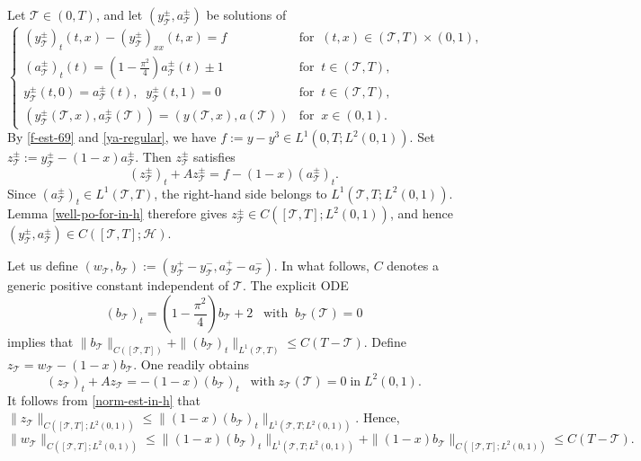 \documentclass[a4paper]{article}
\numberwithin{equation}{section}
\begin{document}
\begin{appendices}
Let $\mathcal{T}\in (0,T)$, and let $(y_{\mathcal{T}}^{\pm },a_{\mathcal{T}}^{\pm })$ be solutions of 
\begin{equation}\label{maxtowepo}
\left\{\begin{array}{ll}
(y_{\mathcal{T}}^{\pm })_t(t,x) -(y_{\mathcal{T}}^{\pm })_{xx}(t,x)=f&\text{for}\;\;(t,x)\in(\mathcal{T},T)\times(0,1),  \\
(a_{\mathcal{T}}^{\pm })_t(t)=(1-\frac{\pi^2}{4})a_{\mathcal{T}}^{\pm }(t)\pm1 & \text{for}\;\;t\in(\mathcal{T},T),  \\
y_{\mathcal{T}}^{\pm }(t,0)=a_{\mathcal{T}}^{\pm }(t),\;\; y_{\mathcal{T}}^{\pm }(t,1)=0& \text{for}\;\;t\in(\mathcal{T},T),  \\
(y_{\mathcal{T}}^{\pm }(\mathcal{T},x),a_{\mathcal{T}}^{\pm }(\mathcal{T}))=(y(\mathcal{T},x),a(\mathcal{T}))& \text{for}\;\;x\in(0,1).
\end{array}\right.
\end{equation}
By \eqref{f-est-69} and \eqref{ya-regular}, we have $f:=y-y^3\in L^1(0,T;L^2(0,1))$. Set $z_{\mathcal T}^{\pm}:=y_{\mathcal T}^{\pm}-(1-x)a_{\mathcal T}^{\pm}$. Then $z_{\mathcal T}^{\pm}$ satisfies
$$(z_{\mathcal T}^{\pm})_t+Az_{\mathcal T}^{\pm}=f-(1-x)(a_{\mathcal T}^{\pm})_t.$$
Since $(a_{\mathcal T}^{\pm})_t\in L^1(\mathcal T,T)$, the right-hand side belongs to $L^1(\mathcal T,T;L^2(0,1))$. Lemma \ref{well-po-for-in-h} therefore gives $z_{\mathcal T}^{\pm}\in C([\mathcal T,T];L^2(0,1))$, and hence $(y_{\mathcal{T}}^{\pm },a_{\mathcal{T}}^{\pm })\in C([\mathcal{T},T];\mathcal{H})$.

Let us define $(w_{\mathcal{T}},b_{\mathcal{T}}):=(y_{\mathcal{T}}^+-y_{\mathcal{T}}^-,a_{\mathcal{T}}^+-a_{\mathcal{T}}^-)$. In what follows, $C$ denotes a generic positive constant independent of $\mathcal T$. The explicit ODE $$(b_{\mathcal{T}})_t=(1-\frac{\pi^2}{4})b_{\mathcal T}+2\;\;\;\text{with}\;\;b_{\mathcal{T}}(\mathcal T)=0$$ implies that $\|b_{\mathcal{T}}\|_{C([\mathcal{T},T])}+\|(b_{\mathcal{T}})_t\|_{L^1(\mathcal{T},T)}\le C(T-\mathcal{T})$.
Define $z_{\mathcal T}=w_{\mathcal T}-(1-x)b_{\mathcal T}$. One readily obtains $$(z_{\mathcal{T}})_t+Az_{\mathcal{T}}=-(1-x)(b_{\mathcal T})_t \;\;\;\text{with} \;z_{\mathcal{T}}(\mathcal{T})=0 \;\text{in}\; L^2(0,1).$$ It follows from \eqref{norm-est-in-h} that $\|z_{\mathcal{T}}\|_{C([\mathcal{T},T];L^2(0,1))}\le \|(1-x)(b_{\mathcal{T}})_t\|_{L^1(\mathcal{T},T;L^2(0,1))}$. Hence,
\begin{equation*} 
\|w_{\mathcal{T}}\|_{C([\mathcal{T},T];L^2(0,1))}\le \|(1-x)(b_{\mathcal{T}})_t\|_{L^1(\mathcal{T},T;L^2(0,1))}+\|(1-x)b_{\mathcal{T}}\|_{C([\mathcal{T},T];L^2(0,1))}\le C(T-\mathcal{T}).
\end{equation*}


\end{appendices}
\end{document}
